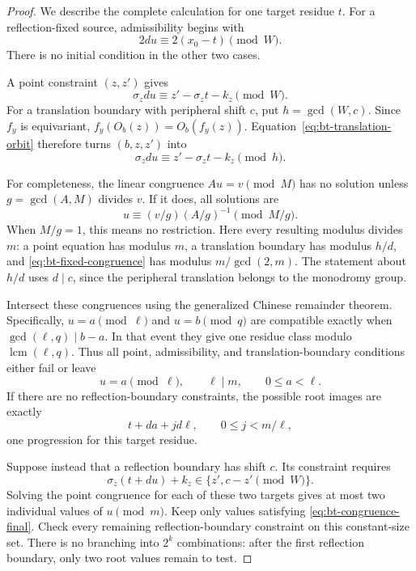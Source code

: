 \documentclass[11pt]{article}
\theoremstyle{definition}
\theoremstyle{remark}
\newcommand{\lcm}{\operatorname{lcm}}
\begin{document}
\begin{proof}
We describe the complete calculation for one target residue $t$.
For a reflection-fixed source, admissibility begins with
\begin{equation}\label{eq:bt-fixed-congruence}
 2du\equiv 2(x_0-t)\pmod W.
\end{equation}
There is no initial condition in the other two cases.

A point constraint $(z,z')$ gives
\begin{equation}\label{eq:bt-point-congruence}
 \sigma_zdu\equiv z'-\sigma_zt-k_z\pmod W.
\end{equation}
For a translation boundary with peripheral shift $c$, put
$h=\gcd(W,c)$.  Since $f_y$ is equivariant,
$f_y(O_b(z))=O_b(f_y(z))$.  Equation~\eqref{eq:bt-translation-orbit}
therefore turns $(b,z,z')$ into
\begin{equation}\label{eq:bt-boundary-congruence}
 \sigma_zdu\equiv z'-\sigma_zt-k_z\pmod h.
\end{equation}

For completeness, the linear congruence $Au=v\pmod M$ has no solution
unless $g=\gcd(A,M)$ divides $v$.  If it does, all solutions are
\[
 u\equiv (v/g)(A/g)^{-1}\pmod{M/g}.
\]
When $M/g=1$, this means no restriction.  Here every resulting modulus
divides $m$: a point equation has modulus $m$, a translation boundary has
modulus $h/d$, and \eqref{eq:bt-fixed-congruence} has modulus
$m/\gcd(2,m)$.  The statement about $h/d$ uses $d\mid c$, since the
peripheral translation belongs to the monodromy group.

Intersect these congruences using the generalized Chinese remainder
theorem.  Specifically, $u=a\pmod\ell$ and $u=b\pmod q$ are compatible
exactly when $\gcd(\ell,q)\mid b-a$.  In that event they give one residue
class modulo $\lcm(\ell,q)$.  Thus all point, admissibility, and
translation-boundary conditions either fail or leave
\begin{equation}\label{eq:bt-congruence-final}
 u=a\pmod\ell,\qquad \ell\mid m,
 \qquad 0\le a<\ell.
\end{equation}
If there are no reflection-boundary constraints, the possible root images
are exactly
\[
 t+da+jd\ell,\qquad 0\le j<m/\ell,
\]
one progression for this target residue.

Suppose instead that a reflection boundary has shift $c$.  Its constraint
requires
\begin{equation}\label{eq:bt-two-targets}
 \sigma_z(t+du)+k_z\in\{z',c-z'\pmod W\}.
\end{equation}
Solving the point congruence for each of these two targets gives at most
two individual values of $u\pmod m$.  Keep only values satisfying
\eqref{eq:bt-congruence-final}.  Check every remaining reflection-boundary
constraint on this constant-size set.  There is no branching into
$2^k$ combinations: after the first reflection boundary, only two root
values remain to test.


\end{proof}
\end{document}
